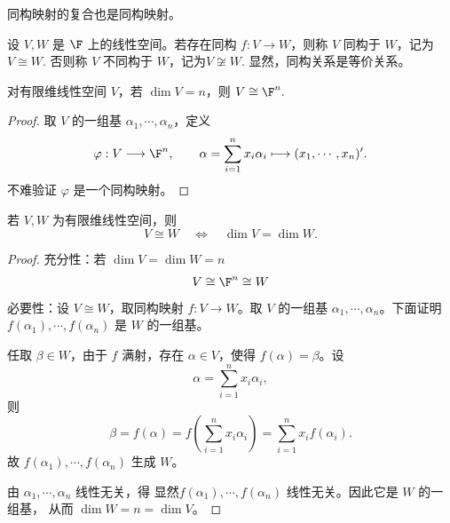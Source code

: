 \begin{corollary}
	同构映射的复合也是同构映射。
\end{corollary}

\begin{definition}\label{p1:concept:c4-l2065}
	设 $V,W$ 是 $\F$ 上的线性空间。若存在同构
	$f:V\to W$，则称 $V$ 同构于 $W$，记为	$V\cong W.$
	否则称 $V$ 不同构于 $W$，记为$V\not\cong W.$
	显然，同构关系是等价关系。
\end{definition}

\begin{lemma}
	对有限维线性空间 $V$，若 $\dim V=n$，则
$V\cong \F^n.$
	
\end{lemma}

\begin{proof}
	取 $V$ 的一组基 $\alpha_1,\cdots,\alpha_n$，定义
	\[
	\varphi:V\longrightarrow \F^n,
	\qquad
	\alpha=\sum_{i=1}^{n}x_i\alpha_i
	\longmapsto
	(x_1,\cdots,x_n)'.
	\]
	不难验证 $\varphi$ 是一个同构映射。
\end{proof}

\begin{theorem}
	若 $V,W$ 为有限维线性空间，则
	\[
	V\cong W
	\quad\Longleftrightarrow\quad
	\dim V=\dim W.
	\]
\end{theorem}

\begin{proof}
	充分性：若 $\dim V=\dim W=n$
	\[V \cong \F^n \cong W\]
	必要性：设 $V\cong W$，取同构映射 $f:V\to W$。取 $V$ 的一组基
	$\alpha_1,\cdots,\alpha_n$。下面证明
	$f(\alpha_1),\cdots,f(\alpha_n)$ 是 $W$ 的一组基。
	
	任取 $\beta\in W$，由于 $f$ 满射，存在 $\alpha\in V$，使得
	$f(\alpha)=\beta$。设
	\[
	\alpha=\sum_{i=1}^{n}x_i\alpha_i,
	\]
	则
	\[
	\beta=f(\alpha)
	=f\left(\sum_{i=1}^{n}x_i\alpha_i\right)
	=\sum_{i=1}^{n}x_if(\alpha_i).
	\]
	故 $f(\alpha_1),\cdots,f(\alpha_n)$ 生成 $W$。
	

	由 $\alpha_1,\cdots,\alpha_n$ 线性无关，得
显然$f(\alpha_1),\cdots,f(\alpha_n)$ 线性无关。因此它是 $W$ 的一组基，
	从而 $\dim W=n=\dim V$。
	
	
\end{proof}

